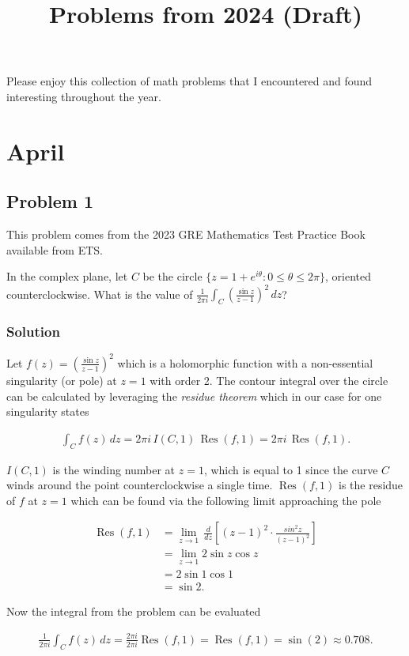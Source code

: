 \documentclass[12pt]{article}
\title{Problems from 2024 (Draft)}
\begin{document}
\maketitle

Please enjoy this collection of math problems that I encountered and found interesting throughout the year.

\setcounter{section}{3}
\section{April}

\subsection{Problem 1}

This problem comes from the 2023 GRE Mathematics Test Practice Book available from ETS.

In the complex plane, let $C$ be the circle $\{ z = 1 + e^{i\theta} : 0 \le \theta \le 2\pi\}$, oriented counterclockwise. What is the value of $\frac{1}{2 \pi i} \int_{C} \left( \frac{\sin z}{z - 1} \right)^2\,dz$?

\subsubsection*{Solution}

Let $f(z) = \left( \frac{\sin z}{z - 1} \right)^2$ which is a holomorphic function with a non-essential singularity (or pole) at $z=1$ with order 2. The contour integral over the circle can be calculated by leveraging the {\em{residue theorem}} which in our case for one singularity states

\begin{align}
  \int_{C} f(z)\, dz = 2 \pi i \, I(C,1) \, \operatorname{Res}(f,1) = 2 \pi i \, \operatorname{Res}(f,1).
\end{align}

$I(C,1)$ is the winding number at $z=1$, which is equal to 1 since the curve $C$ winds around the point counterclockwise a single time. $\operatorname{Res}(f,1)$ is the residue of $f$ at $z=1$ which can be found via the following limit approaching the pole

\begin{align}
  \operatorname{Res}(f,1)
    &= \lim_{z \rightarrow 1} \, \frac{d}{dz} \left[ \left(z - 1\right)^2 \cdot \frac{sin^2 z}{(z-1)^2} \right] \\
    &= \lim_{z \rightarrow 1} 2 \sin z \cos z \\
    &= 2 \sin 1 \cos 1 \\
    &= \sin 2.
\end{align}

Now the integral from the problem can be evaluated

\begin{align}
  \frac{1}{2 \pi i} \int_{C} f(z)\,dz
    = \frac{2 \pi i}{2 \pi i} \operatorname{Res}(f,1)
    = \operatorname{Res}(f,1)
    = \sin(2)
    \approx 0.708.
\end{align}
\end{document}

